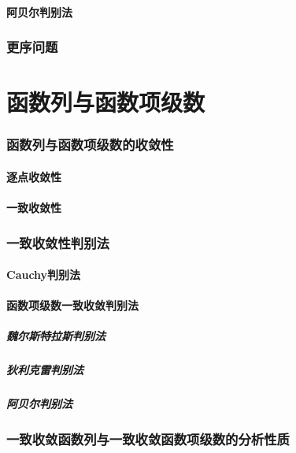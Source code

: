 \documentclass[UTF8]{ctexart}
\begin{document}
    \subsection{阿贝尔判别法}
\section{更序问题}
\part{函数列与函数项级数}
    \section{函数列与函数项级数的收敛性}
        \subsection{逐点收敛性}
        \subsection{一致收敛性}
    \section{一致收敛性判别法}
        \subsection{Cauchy判别法}
        \subsection{函数项级数一致收敛判别法}
            \subsubsection{魏尔斯特拉斯判别法}
            \subsubsection{狄利克雷判别法}
            \subsubsection{阿贝尔判别法}
    \section{一致收敛函数列与一致收敛函数项级数的分析性质}
\end{document}
